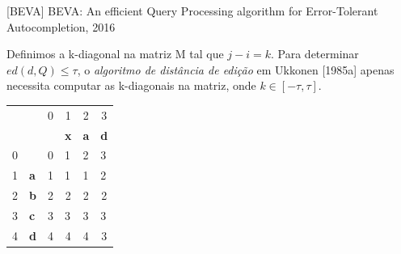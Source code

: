 \documentclass[11pt]{beamer}
\begin{document}
\begin{frame}{[BEVA] BEVA: An efficient Query Processing algorithm for Error-Tolerant Autocompletion, 2016}

    Definimos a k-diagonal na matriz M tal que $j - i = k$. Para determinar $ed(d, Q) \le \tau$, o \textit{algoritmo de distância de edição} em Ukkonen [1985a] apenas necessita computar as k-diagonais na matriz, onde $k \in [-\tau, \tau]$.
  
    \begin{table}[]
    \begin{tabular}{llllll}
     &  & \multicolumn{1}{c}{{\color[HTML]{656565} 0}} & \multicolumn{1}{c}{{\color[HTML]{656565} 1}} & \multicolumn{1}{c}{{\color[HTML]{656565} 2}} & \multicolumn{1}{c}{{\color[HTML]{656565} 3}} \\
     &  &  & \textbf{x} & \textbf{a} & \textbf{d} \\ \cline{3-6} 
    {\color[HTML]{656565} 0} & \multicolumn{1}{l|}{} & \multicolumn{1}{l|}{{\color[HTML]{000000} 0}} & \multicolumn{1}{l|}{{\color[HTML]{000000} 1}} & \multicolumn{1}{l|}{{\color[HTML]{000000} 2}} & \multicolumn{1}{l|}{{\color[HTML]{000000} 3}} \\ \cline{3-6} 
    {\color[HTML]{656565} 1} & \multicolumn{1}{l|}{\textbf{a}} & \multicolumn{1}{l|}{{\color[HTML]{000000} 1}} & \multicolumn{1}{l|}{{\color[HTML]{000000} 1}} & \multicolumn{1}{l|}{{\color[HTML]{000000} 1}} & \multicolumn{1}{l|}{{\color[HTML]{000000} 2}} \\ \cline{3-6} 
    {\color[HTML]{656565} 2} & \multicolumn{1}{l|}{\textbf{b}} & \multicolumn{1}{c|}{{\color[HTML]{000000} 2}} & \multicolumn{1}{c|}{{\color[HTML]{000000} 2}} & \multicolumn{1}{c|}{{\color[HTML]{000000} 2}} & \multicolumn{1}{c|}{{\color[HTML]{000000} 2}} \\ \cline{3-6} 
    {\color[HTML]{656565} 3} & \multicolumn{1}{l|}{\textbf{c}} & \multicolumn{1}{l|}{{\color[HTML]{000000} 3}} & \multicolumn{1}{l|}{{\color[HTML]{000000} 3}} & \multicolumn{1}{l|}{{\color[HTML]{000000} 3}} & \multicolumn{1}{l|}{{\color[HTML]{000000} 3}} \\ \cline{3-6} 
    {\color[HTML]{656565} 4} & \multicolumn{1}{l|}{\textbf{d}} & \multicolumn{1}{c|}{{\color[HTML]{000000} 4}} & \multicolumn{1}{c|}{{\color[HTML]{000000} 4}} & \multicolumn{1}{c|}{{\color[HTML]{000000} 4}} & \multicolumn{1}{c|}{{\color[HTML]{000000} 3}} \\ \cline{3-6} 
    \end{tabular}
    \end{table}
    
\end{frame}
\end{document}
